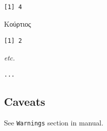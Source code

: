 \documentclass[a4paper,11pt]{memoir}
\providecommand{\tightlist}{%
  \setlength{\itemsep}{0pt}\setlength{\parskip}{0pt}}
\begin{document}
\begin{verbatim}
[1] 4
\end{verbatim}

Κούρτιος

\begin{verbatim}
[1] 2
\end{verbatim}

\emph{etc.}

\begin{verbatim}
...
\end{verbatim}

\hypertarget{caveats}{%
\subsection{Caveats}\label{caveats}}

See \texttt{Warnings} section in manual.

%   
%   
%   
%   
%   
%   
%   
\end{document}
